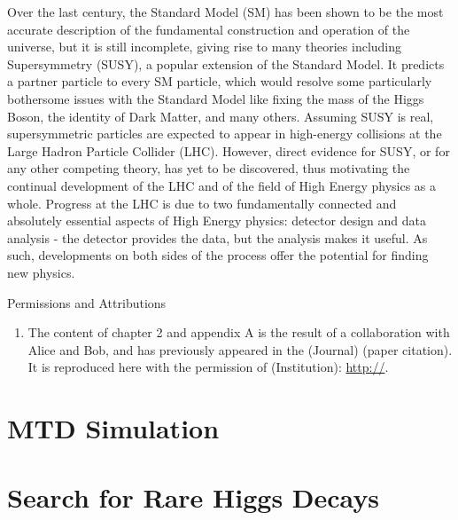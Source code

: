 \documentclass[oneside,12pt,final]{sty/ucthesis-CA2012}
\begin{document}
\begin{mainmatter}
Over the last century, the Standard Model (SM) has been shown to be the most accurate description of the fundamental construction and operation of the universe, but it is still incomplete, giving rise to many theories including Supersymmetry (SUSY), a popular extension of the Standard Model. It predicts a partner particle to every SM particle, which would resolve some particularly bothersome issues with the Standard Model like fixing the mass of the Higgs Boson, the identity of Dark Matter, and many others. Assuming SUSY is real, supersymmetric particles are expected to appear in high-energy collisions at the Large Hadron Particle Collider (LHC). However, direct evidence for SUSY, or for any other competing theory, has yet to be discovered, thus motivating the continual development of the LHC and of the field of High Energy physics as a whole. Progress at the LHC is due to two fundamentally connected and absolutely essential aspects of High Energy physics: detector design and data analysis - the detector provides the data, but the analysis makes it useful. As such, developments on both sides of the process offer the potential for finding new physics.

\begin{section}{Permissions and Attributions}
\begin{enumerate}

\item The content of chapter 2 and appendix A is the result of a collaboration with Alice and Bob, and has previously appeared in the (Journal) (paper citation). It is reproduced here with the permission of (Institution): \url{http://}.

\end{enumerate}
\end{section}

\chapter{MTD Simulation}


\chapter{Search for Rare Higgs Decays}


\appendix

\dsp


\end{mainmatter}
\end{document}

